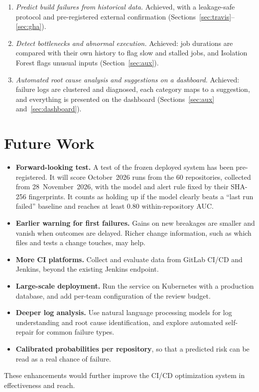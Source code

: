 \begin{enumerate}
\item \textit{Predict build failures from historical data.} Achieved, with a leakage-safe protocol and pre-registered external confirmation (Sections~\ref{sec:travis}--\ref{sec:gha}).
\item \textit{Detect bottlenecks and abnormal execution.} Achieved: job durations are compared with their own history to flag slow and stalled jobs, and Isolation Forest flags unusual inputs (Section~\ref{sec:aux}).
\item \textit{Automated root cause analysis and suggestions on a dashboard.} Achieved: failure logs are clustered and diagnosed, each category maps to a suggestion, and everything is presented on the dashboard (Sections~\ref{sec:aux} and~\ref{sec:dashboard}).
\end{enumerate}

\section{Future Work}
\begin{itemize}
\item \textbf{Forward-looking test.} A test of the frozen deployed system has been pre-registered. It will score October~2026 runs from the 60 repositories, collected from 28~November~2026, with the model and alert rule fixed by their SHA-256 fingerprints. It counts as holding up if the model clearly beats a ``last run failed'' baseline and reaches at least 0.80 within-repository AUC.
\item \textbf{Earlier warning for first failures.} Gains on new breakages are smaller and vanish when outcomes are delayed. Richer change information, such as which files and tests a change touches, may help.
\item \textbf{More CI platforms.} Collect and evaluate data from GitLab CI/CD and Jenkins, beyond the existing Jenkins endpoint.
\item \textbf{Large-scale deployment.} Run the service on Kubernetes with a production database, and add per-team configuration of the review budget.
\item \textbf{Deeper log analysis.} Use natural language processing models for log understanding and root cause identification, and explore automated self-repair for common failure types.
\item \textbf{Calibrated probabilities per repository}, so that a predicted risk can be read as a real chance of failure.
\end{itemize}

These enhancements would further improve the CI/CD optimization system in effectiveness and reach.
